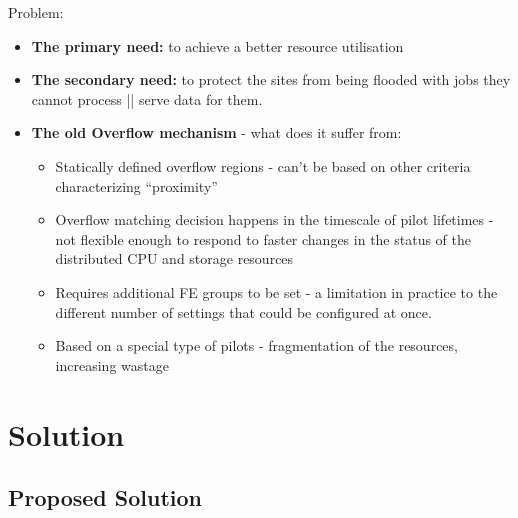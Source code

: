 \documentclass[8pt,mathserif,a4paper,oneside,pdf]{beamer}
\begin{document}
\begin{frame}[fragile]{Problem:}

  \begin{itemize}
  \item
    \textbf{The primary need:} to achieve a better resource utilisation
  \item
    \textbf{The secondary need:} to protect the sites from being flooded with jobs they cannot process || serve data for them.
  \item
   \textbf{The old Overflow mechanism} - what does it suffer from:
    \begin{itemize}
    \item
      Statically defined overflow regions -  can't be based on other criteria characterizing ``proximity''
    \item
      Overflow matching decision happens in the timescale of pilot lifetimes -  not flexible enough to respond to faster changes in the status of the distributed CPU and storage resources
    \item
      Requires additional FE groups to be set - a limitation in practice to the different number of settings that could be configured at once.
    \item
      Based on a special type of pilots - fragmentation of the resources, increasing wastage
    \end{itemize}
  \end{itemize}

\end{frame}


\section[Solution]{Solution}
\subsection[Proposed Solution]{Proposed Solution}
\end{document}
